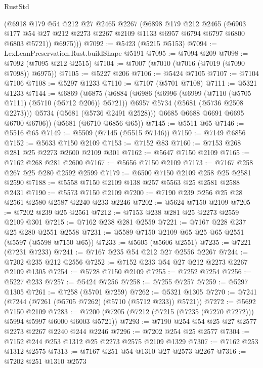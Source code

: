 \begin{lexlean}{RustStd}
\begin{coremodule}
        (@6918
          @179
          @54
          @212
          @27
          @2465
          @2267
          (@6898
            @179
            @212
            @2465
            (@6903 @177 @54 @27 @212 @2273 @2267 @2109 @1133 @6957 @6794 @6797 @6800 @6803 @5721))
          @6975)))
@7092 := @5423 (@5215 @5153)
@7094 := LexLeanPreservation.Rust.buildShape @5191
@7095 := @7094 @209
@7098 := @7092 (@7095 @212 @2515)
@7104 := @7007 (@7010 (@7016 (@7019 (@7090 @7098)) @6975))
@7105 := @5227 @206
@7106 := @5424 @7105
@7107 := @7104 @7106
@7108 := @5297 @1233
@7110 := @7107 (@5701 @7108)
@7111 := @5321 @1233
@7144 := @6869
    (@6875
      (@6884
        (@6986
          (@6996
            (@6999 (@7110 (@5705 @7111) (@5710 (@5712 @206)) @5721))
            @6957
            @5734
            (@5681 (@5736 @2508 @2273)))
          @5734
          (@5681 (@5736 @2491 @2528)))
        @6685
        @6688
        @6691
        @6695
        @6700
        @6706))
    (@5681 (@6710 @6856 @65))
@7145 := @5511 @65
@7146 := @5516 @65
@7149 := @5509 (@7145 (@5515 @7146))
@7150 := @7149 @6856
@7152 := @5633 @7150 @2109
@7153 := @7152 @83
@7160 := @7153 @268 @281 @25 @2273 @2600 @2109 @301
@7162 := @5647 @7150 @2109
@7165 := @7162 @268 @281 @2600
@7167 := @5656 @7150 @2109
@7173 := @7167 @258 @267 @25 @280 @2592 @2599
@7179 := @6500 @7150 @2109 @258 @25 @2581 @2590
@7188 := @5558 @7150 @2109 @138 @257 @5563 @25 @2581 @2588 @2431
@7190 := @5573 @7150 @2109
@7200 := @7190 @239 @256 @25 @28 @2561 @2580 @2587 @2240 @233 @2246
@7202 := @5624 @7150 @2109
@7205 := @7202 @239 @25 @2561
@7212 := @7153 @238 @281 @25 @2273 @2559 @2109 @301
@7215 := @7162 @238 @281 @2559
@7221 := @7167 @228 @237 @25 @280 @2551 @2558
@7231 := @5589 @7150 @2109 @65 @25 @65 @2551 (@5597 (@5598 @7150 @65))
@7233 := @5605 (@5606 @2551)
@7235 := @7221 (@7231 @7233)
@7241 := @7167 @235 @54 @212 @27 @2556 @2267
@7244 := @7202 @235 @212 @2556
@7252 := @7152 @233 @54 @27 @212 @2273 @2267 @2109 @1305
@7254 := @5728 @7150 @2109
@7255 := @7252 @7254
@7256 := @5227 @233
@7257 := @5424 @7256
@7258 := @7255 @7257
@7259 := @5297 @1305
@7261 := @7258 (@5701 @7259)
@7262 := @5321 @1305
@7270 := @7241 (@7244 (@7261 (@5705 @7262) (@5710 (@5712 @233)) @5721))
@7272 := @5692 @7150 @2109
@7283 := @7200 (@7205 (@7212 (@7215 (@7235 (@7270 @7272))) @5994 @5997 @6000 @6003 @5721))
@7293 := @7190 @254 @54 @25 @27 @2577 @2273 @2267 @2240 @244 @2246
@7296 := @7202 @254 @25 @2577
@7304 := @7152 @244 @253 @1312 @25 @2273 @2575 @2109 @1329
@7307 := @7162 @253 @1312 @2575
@7313 := @7167 @251 @54 @1310 @27 @2573 @2267
@7316 := @7202 @251 @1310 @2573

\end{coremodule}
\end{lexlean}

